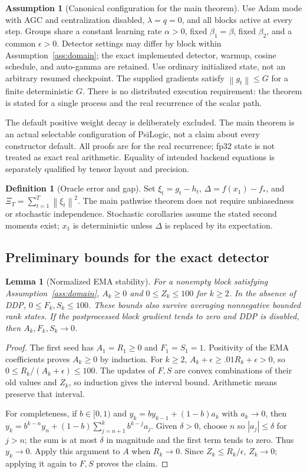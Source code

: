 \documentclass[11pt,a4paper]{article}
\newtheorem{lemma}[theorem]{Lemma}
\theoremstyle{definition}
\newtheorem{definition}[theorem]{Definition}
\newtheorem{assumption}[theorem]{Assumption}
\theoremstyle{remark}
\newcommand{\norm}[1]{\left\lVert#1\right\rVert}
\begin{document}
\begin{assumption}[Canonical configuration for the main theorem]\label{ass:canonical}
Use Adam mode with AGC and centralization disabled, $\lambda=q=0$, and all
blocks active at every step. Groups share a constant learning rate $\alpha>0$,
fixed $\beta_1=\beta$, fixed $\beta_2$, and a common $\epsilon>0$. Detector
settings may differ by block within Assumption~\ref{ass:domain}; the exact
implemented detector, warmup, cosine schedule, and auto-gamma are retained.
Use ordinary initialized state, not an arbitrary resumed checkpoint. The
supplied gradients satisfy $\norm{g_t}\le G$ for a finite deterministic $G$.
There is no distributed execution requirement: the theorem is stated for a
single process and the real recurrence of the scalar path.
\end{assumption}
The default positive weight decay is deliberately excluded. The main theorem
is an actual selectable configuration of PsiLogic, not a claim about every
constructor default. All proofs are for the real recurrence; fp32 state is
not treated as exact real arithmetic. Equality of intended backend equations
is separately qualified by tensor layout and precision.

\begin{definition}[Oracle error and gap]
Set $\xi_t=g_t-h_t$, $\Delta=f(x_1)-f_*$, and
$\Xi_T=\sum_{t=1}^T\norm{\xi_t}^2$. The main pathwise theorem does not require
unbiasedness or stochastic independence. Stochastic corollaries assume the
stated second moments exist; $x_1$ is deterministic unless $\Delta$ is replaced
by its expectation.
\end{definition}

\subsection{Preliminary bounds for the exact detector}\label{sec:bounds}
\begin{lemma}[Normalized EMA stability]\label{lem:ema}
For a nonempty block satisfying Assumption~\ref{ass:domain}, $A_k\ge0$ and
$0\le Z_k\le100$ for $k\ge2$. In the absence of DDP, $0\le F_k,S_k\le100$.
These bounds also survive averaging nonnegative bounded rank states. If the
postprocessed block gradient tends to zero and DDP is disabled, then
$A_k,F_k,S_k\to0$.
\end{lemma}
\begin{proof}
The first seed has $A_1=R_1\ge0$ and $F_1=S_1=1$. Positivity of the EMA
coefficients proves $A_k\ge0$ by induction. For $k\ge2$,
$A_k+\epsilon\ge .01R_k+\epsilon>0$, so
$0\le R_k/(A_k+\epsilon)\le100$. The updates of $F,S$ are convex combinations
of their old values and $Z_k$, so induction gives the interval bound.
Arithmetic means preserve that interval.

For completeness, if $b\in[0,1)$ and $y_k=by_{k-1}+(1-b)a_k$ with
$a_k\to0$, then $y_k=b^{k-n}y_n+(1-b)\sum_{j=n+1}^k b^{k-j}a_j$.
Given $\delta>0$, choose $n$ so $|a_j|\le\delta$ for $j>n$; the sum is at
most $\delta$ in magnitude and the first term tends to zero. Thus $y_k\to0$.
Apply this argument to $A$ when $R_k\to0$. Since $Z_k\le R_k/\epsilon$,
$Z_k\to0$; applying it again to $F,S$ proves the claim.
\end{proof}
\end{document}
